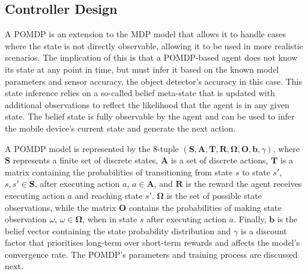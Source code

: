 \documentclass[runningheads]{llncs}
\begin{document}


\subsection{Controller Design}

A POMDP is an extension to the MDP model that allows it to handle cases where the state is not directly observable, allowing it to be used in more realistic scenarios. 
The implication of this is that a POMDP-based agent does not know its state at any point in time, but must infer it based on the known model parameters and sensor accuracy, the object detector's accuracy in this case.
This state inference relies on a so-called belief meta-state that is updated with additional observations to reflect the likelihood that the agent is in any given state.
The belief state is fully observable by the agent and can be used to infer the mobile device's current state and generate the next action.

A POMDP model is represented by the 8-tuple $(\mathbf{S}, \mathbf{A}, \mathbf{T}, \mathbf{R}, \mathbf{\Omega}, \mathbf{O}, \mathbf{b}, \gamma)$, where $\mathbf{S}$ represents a finite set of discrete states, $\mathbf{A}$ is a set of discrete actions, $\mathbf{T}$ is a matrix containing the probabilities of transitioning from state $s$ to state $s'$, $s, s' \in \mathbf{S}$, after executing action $a$, $a \in \mathbf{A}$, and $\mathbf{R}$ is the reward the agent receives executing action $a$ and reaching state $s'$.
$\mathbf{\Omega}$ is the set of possible state observations, while the matrix $\mathbf{O}$ contains the probabilities of making state observation $\omega$, $\omega \in \mathbf{\Omega}$, when in state $s$ after executing action $a$.
Finally, $\mathbf{b}$ is the belief vector containing the state probability distribution and $\gamma$ is a discount factor that prioritises long-term over short-term rewards and affects the model's convergence rate. 
The POMDP's parameters and training process are discussed next. 
\end{document}
